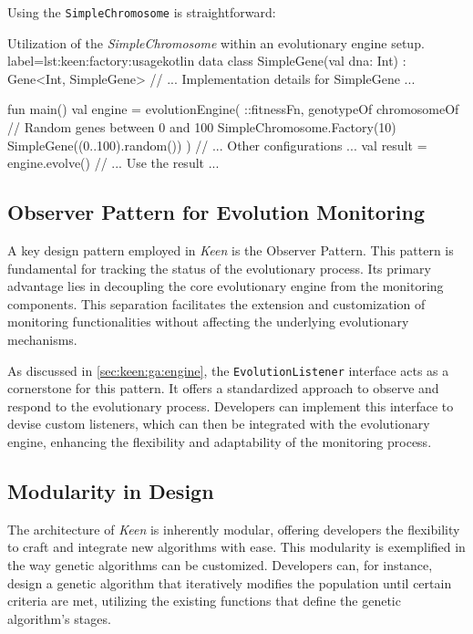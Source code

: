         Using the \texttt{SimpleChromosome} is straightforward:

        \begin{code}{
        Utilization of the \textit{SimpleChromosome} within an evolutionary 
        engine setup.
        }{label=lst:keen:factory:usage}{kotlin}
        data class SimpleGene(val dna: Int) : Gene<Int, SimpleGene> {
            // ... Implementation details for SimpleGene ...
        }
                
        fun main() {
            val engine = evolutionEngine(
                ::fitnessFn,
                genotypeOf {
                    chromosomeOf {
                        // Random genes between 0 and 100
                        SimpleChromosome.Factory(10) { SimpleGene((0..100).random()) }
                    }
                }
            ) {
                // ... Other configurations ...
            }
            val result = engine.evolve()
            // ... Use the result ...
        }
        \end{code}

    \subsection{Observer Pattern for Evolution Monitoring}
        A key design pattern employed in \textit{Keen} is the Observer Pattern. This pattern is fundamental for tracking the status of the evolutionary process. Its primary advantage lies in decoupling the core evolutionary engine 
        from the monitoring components. This separation facilitates the extension and customization of monitoring 
        functionalities without affecting the underlying evolutionary mechanisms.

        As discussed in \vref{sec:keen:ga:engine}, the \texttt{EvolutionListener} interface acts as a cornerstone for 
        this pattern. It offers a standardized approach to observe and respond to the evolutionary process. Developers 
        can implement this interface to devise custom listeners, which can then be integrated with the evolutionary 
        engine, enhancing the flexibility and adaptability of the monitoring process.

    \subsection{Modularity in Design}
        The architecture of \textit{Keen} is inherently modular, offering developers
        the flexibility to craft and integrate new algorithms with ease. This
        modularity is exemplified in the way genetic algorithms can be customized.
        Developers can, for instance, design a genetic algorithm that iteratively
        modifies the population until certain criteria are met, utilizing the
        existing functions that define the genetic algorithm's stages.

